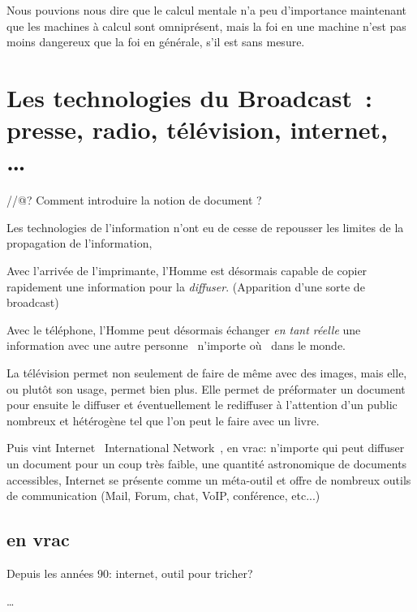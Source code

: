 Nous pouvions nous dire que le calcul mentale n'a peu d'importance maintenant que les machines à calcul sont omniprésent, mais la foi en une machine n'est pas moins dangereux que la foi en générale, s'il est sans mesure. 


\chapter{Les technologies du \og{}Broadcast\fg{}~: presse, radio, télévision, internet, \ldots}


//@? Comment introduire la notion de document ?

Les technologies de l'information n'ont eu de cesse de repousser les limites de
la propagation de l'information, 

Avec l'arrivée de l'imprimante, l'Homme est désormais capable de copier
rapidement une information pour la \emph{diffuser}. (Apparition d'une sorte
de broadcast)

Avec le téléphone, l'Homme peut désormais échanger \emph{en tant réelle} une 
information avec une autre personne \og{}~n'importe où~\fg{} dans le monde.

La télévision permet non seulement de faire de même avec des images, mais elle,
ou plutôt son usage, permet bien plus. Elle permet de préformater un document pour ensuite le
diffuser et éventuellement le rediffuser à l'attention d'un public nombreux et
hétérogène tel que l'on peut le faire avec un livre.

Puis vint Internet \og{}~International Network~\fg{}, en vrac: n'importe qui
peut diffuser un document pour un coup très faible, une quantité astronomique
de documents accessibles, Internet se présente comme un méta-outil et offre de
nombreux outils de communication (Mail, Forum, chat, VoIP, conférence, etc...)

\section{en vrac}



Depuis les années 90: internet, outil pour tricher?

\ldots

